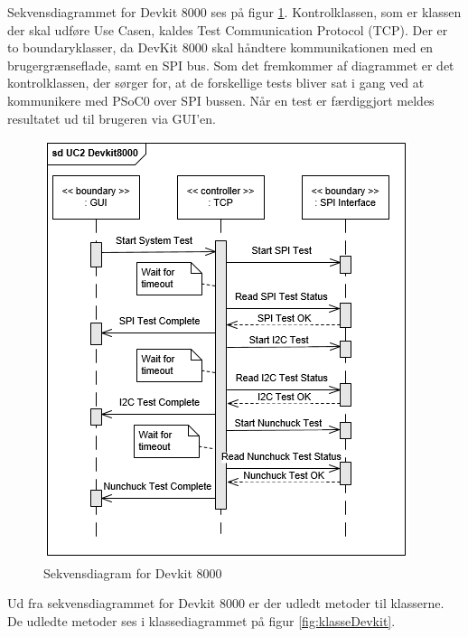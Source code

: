 Sekvensdiagrammet for Devkit 8000 ses på figur \ref{fig:sekvensDevkit}. Kontrolklassen, som er klassen der skal udføre Use Casen, kaldes Test Communication Protocol (TCP). Der er to boundaryklasser, da DevKit 8000 skal håndtere kommunikationen med en brugergrænseflade, samt en SPI bus. Som det fremkommer af diagrammet er det kontrolklassen, der sørger for, at de forskellige tests bliver sat i gang ved at kommunikere med PSoC0 over SPI bussen. Når en test er færdiggjort meldes resultatet ud til brugeren via GUI'en.

\begin{figure}[H]
	\centering
	\includegraphics[]{Systemarkitektur/images/DevKit8000SequenceDiagram.png}
	\caption{Sekvensdiagram for Devkit 8000}
	\label{fig:sekvensDevkit}
\end{figure}

Ud fra sekvensdiagrammet for Devkit 8000 er der udledt metoder til klasserne. De udledte metoder ses i klassediagrammet på figur \ref{fig:klasseDevkit}. 

